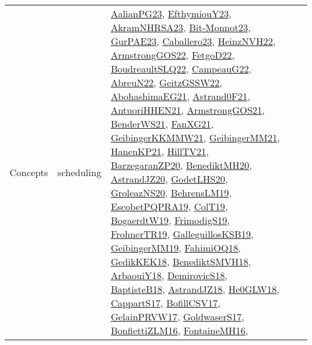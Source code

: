 {\begin{longtable}{lp{3cm}>{\raggedright}p{6cm}>{\raggedright}p{6cm}p{8cm}}
Concepts & scheduling & \href{papers/AalianPG23.pdf}{AalianPG23}\cite{AalianPG23}, \href{papers/EfthymiouY23.pdf}{EfthymiouY23}\cite{EfthymiouY23}, \href{articles/AkramNHRSA23.pdf}{AkramNHRSA23}\cite{AkramNHRSA23}, \href{papers/Bit-Monnot23.pdf}{Bit-Monnot23}\cite{Bit-Monnot23}, \href{articles/GurPAE23.pdf}{GurPAE23}\cite{GurPAE23}, \href{articles/Caballero23.pdf}{Caballero23}\cite{Caballero23}, \href{articles/HeinzNVH22.pdf}{HeinzNVH22}\cite{HeinzNVH22}, \href{papers/ArmstrongGOS22.pdf}{ArmstrongGOS22}\cite{ArmstrongGOS22}, \href{articles/FetgoD22.pdf}{FetgoD22}\cite{FetgoD22}, \href{papers/BoudreaultSLQ22.pdf}{BoudreaultSLQ22}\cite{BoudreaultSLQ22}, \href{articles/CampeauG22.pdf}{CampeauG22}\cite{CampeauG22}, \href{articles/AbreuN22.pdf}{AbreuN22}\cite{AbreuN22}, \href{papers/GeitzGSSW22.pdf}{GeitzGSSW22}\cite{GeitzGSSW22}, \href{articles/AbohashimaEG21.pdf}{AbohashimaEG21}\cite{AbohashimaEG21}, \href{papers/Astrand0F21.pdf}{Astrand0F21}\cite{Astrand0F21}, \href{papers/AntuoriHHEN21.pdf}{AntuoriHHEN21}\cite{AntuoriHHEN21}, \href{papers/ArmstrongGOS21.pdf}{ArmstrongGOS21}\cite{ArmstrongGOS21}, \href{papers/BenderWS21.pdf}{BenderWS21}\cite{BenderWS21}, \href{articles/FanXG21.pdf}{FanXG21}\cite{FanXG21}, \href{papers/GeibingerKKMMW21.pdf}{GeibingerKKMMW21}\cite{GeibingerKKMMW21}, \href{papers/GeibingerMM21.pdf}{GeibingerMM21}\cite{GeibingerMM21}, \href{papers/HanenKP21.pdf}{HanenKP21}\cite{HanenKP21}, \href{papers/HillTV21.pdf}{HillTV21}\cite{HillTV21}, \href{papers/BarzegaranZP20.pdf}{BarzegaranZP20}\cite{BarzegaranZP20}, \href{articles/BenediktMH20.pdf}{BenediktMH20}\cite{BenediktMH20}, \href{articles/AstrandJZ20.pdf}{AstrandJZ20}\cite{AstrandJZ20}, \href{papers/GodetLHS20.pdf}{GodetLHS20}\cite{GodetLHS20}, \href{papers/GroleazNS20.pdf}{GroleazNS20}\cite{GroleazNS20}, \href{papers/BehrensLM19.pdf}{BehrensLM19}\cite{BehrensLM19}, \href{articles/EscobetPQPRA19.pdf}{EscobetPQPRA19}\cite{EscobetPQPRA19}, \href{papers/ColT19.pdf}{ColT19}\cite{ColT19}, \href{papers/BogaerdtW19.pdf}{BogaerdtW19}\cite{BogaerdtW19}, \href{papers/FrimodigS19.pdf}{FrimodigS19}\cite{FrimodigS19}, \href{papers/FrohnerTR19.pdf}{FrohnerTR19}\cite{FrohnerTR19}, \href{papers/GalleguillosKSB19.pdf}{GalleguillosKSB19}\cite{GalleguillosKSB19}, \href{papers/GeibingerMM19.pdf}{GeibingerMM19}\cite{GeibingerMM19}, \href{articles/FahimiOQ18.pdf}{FahimiOQ18}\cite{FahimiOQ18}, \href{articles/GedikKEK18.pdf}{GedikKEK18}\cite{GedikKEK18}, \href{papers/BenediktSMVH18.pdf}{BenediktSMVH18}\cite{BenediktSMVH18}, \href{papers/ArbaouiY18.pdf}{ArbaouiY18}\cite{ArbaouiY18}, \href{papers/DemirovicS18.pdf}{DemirovicS18}\cite{DemirovicS18}, \href{articles/BaptisteB18.pdf}{BaptisteB18}\cite{BaptisteB18}, \href{papers/AstrandJZ18.pdf}{AstrandJZ18}\cite{AstrandJZ18}, \href{papers/He0GLW18.pdf}{He0GLW18}\cite{He0GLW18}, \href{papers/CappartS17.pdf}{CappartS17}\cite{CappartS17}, \href{papers/BofillCSV17.pdf}{BofillCSV17}\cite{BofillCSV17}, \href{papers/GelainPRVW17.pdf}{GelainPRVW17}\cite{GelainPRVW17}, \href{papers/GoldwaserS17.pdf}{GoldwaserS17}\cite{GoldwaserS17}, \href{papers/BonfiettiZLM16.pdf}{BonfiettiZLM16}\cite{BonfiettiZLM16}, \href{papers/FontaineMH16.pdf}{FontaineMH16}\cite{FontaineMH16}, 
\end{longtable}}
